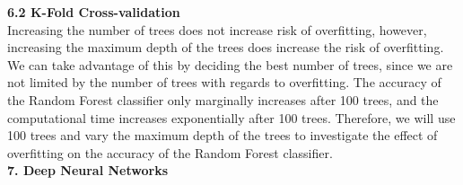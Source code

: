 \documentclass[12pt]{article}
\begin{document}
\vspace{20pt}

\textbf{6.2 K-Fold Cross-validation}
\\
Increasing the number of trees does not increase risk of overfitting, however, increasing the maximum depth of the trees does increase the risk of overfitting. We can take advantage of this by deciding the best number of trees, since we are not limited by the number of trees with regards to overfitting. The accuracy of the Random Forest classifier only marginally increases after 100 trees, and the computational time increases exponentially after 100 trees. Therefore, we will use 100 trees and vary the maximum depth of the trees to investigate the effect of overfitting on the accuracy of the Random Forest classifier.
\\


\textbf{7. Deep Neural Networks}
\end{document}

